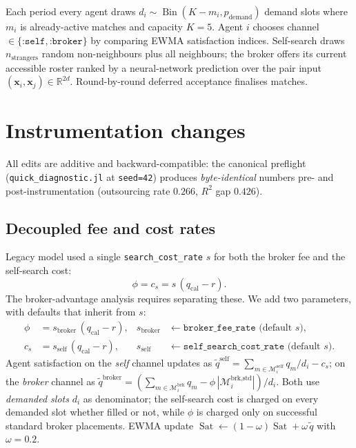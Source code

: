\documentclass[11pt,a4paper]{article}
\newcommand{\xvec}{\mathbf{x}}
\begin{document}
Each period every agent draws $d_i \sim \operatorname{Bin}(K{-}m_i, p_{\mathrm{demand}})$ demand slots where $m_i$ is already-active matches and capacity $K{=}5$. Agent $i$ chooses channel $\in\{\texttt{:self},\texttt{:broker}\}$ by comparing EWMA satisfaction indices. Self-search draws $n_\text{strangers}$ random non-neighbours plus all neighbours; the broker offers its current accessible roster ranked by a neural-network prediction over the pair input $(\xvec_i,\xvec_j) \in \mathbb{R}^{2d}$. Round-by-round deferred acceptance finalises matches.

\section{Instrumentation changes}
\label{sec:instrumentation}
All edits are additive and backward-compatible: the canonical preflight (\texttt{quick\_diagnostic.jl} at \texttt{seed=42}) produces \emph{byte-identical} numbers pre- and post-instrumentation (outsourcing rate $0.266$, $R^2$ gap $0.426$).

\subsection{Decoupled fee and cost rates}
Legacy model used a single \texttt{search\_cost\_rate} $s$ for both the broker fee and the self-search cost:
\[
\phi = c_s = s\,(q_{\mathrm{cal}} - r).
\]
The broker-advantage analysis requires separating these. We add two parameters, with defaults that inherit from $s$:
\begin{align}
\phi &= s_{\mathrm{broker}}\,(q_{\mathrm{cal}}-r), & s_{\mathrm{broker}} &\leftarrow \texttt{broker\_fee\_rate}\text{ (default }s\text{)},\\
c_s  &= s_{\mathrm{self}}  \,(q_{\mathrm{cal}}-r), & s_{\mathrm{self}} &\leftarrow \texttt{self\_search\_cost\_rate}\text{ (default }s\text{)}.
\end{align}
Agent satisfaction on the \emph{self} channel updates as $\tilde q^{\text{self}} = \sum_{m \in \mathcal{M}_i^\text{self}} q_m / d_i - c_s$; on the \emph{broker} channel as $\tilde q^{\text{broker}} = (\sum_{m \in \mathcal{M}_i^\text{brk}} q_m - \phi\,|\mathcal{M}_i^\text{brk,std}|)/d_i$. Both use \emph{demanded slots} $d_i$ as denominator; the self-search cost is charged on every demanded slot whether filled or not, while $\phi$ is charged only on successful standard broker placements. EWMA update $\operatorname{Sat} \leftarrow (1-\omega)\operatorname{Sat} + \omega\,\tilde q$ with $\omega=0.2$.
\end{document}
